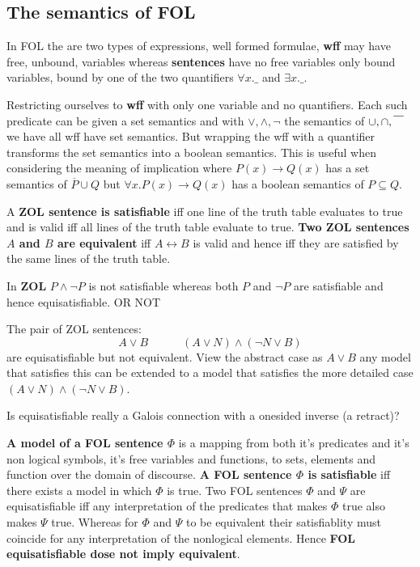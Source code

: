 \subsection{The semantics of FOL}



In FOL the are two types of expressions, well formed formulae, {\bf wff}  may have free, unbound, variables whereas  {\bf sentences} have no free variables only  bound variables, bound  by one of the two quantifiers $\forall x.\_$ and $\exists x. \_$. 


Restricting ourselves to  {\bf wff} with only one variable and no quantifiers. Each such predicate can be given a set  semantics  and with $\vee, \wedge, \neg$ the semantics of $\cup, \cap, \overline{\color{white} X}$ we have all wff have set semantics. But wrapping the wff with a quantifier transforms the set semantics into a boolean semantics. This is useful when considering the meaning of implication where  $P(x)\rightarrow Q(x)$ has a set semantics of $\overline{P} \cup Q$ but  $\forall x. P(x)\rightarrow Q(x)$ has a boolean semantics of $P \subseteq Q$.

A {\bf ZOL sentence is satisfiable}  iff one line of the truth table evaluates to true and is valid iff all lines of the truth table evaluate to true. {\bf Two ZOL sentences $A$ and $B$ are  equivalent} iff $A\leftrightarrow B$ is valid and hence iff they are satisfied by the same lines of the truth table. 

In  {\bf ZOL}  $P\wedge  \neg P$ is not satisfiable whereas both $P$ and $\neg P$ are satisfiable and hence equisatisfiable. OR NOT

The pair of ZOL sentences:
\[A\vee B \hspace{3em} (A\vee N) \wedge (\neg N \vee B)\] 
are equisatisfiable but not equivalent.  View the abstract case as $A\vee B $ any model that satisfies this can be extended to a model that satisfies the more detailed case $(A\vee N) \wedge (\neg N \vee B)$.

Is equisatisfiable really a Galois connection with a onesided inverse  (a retract)?
  


{\bf A model of a FOL sentence $\Phi$} is a mapping from both it's predicates and it's non logical symbols, it's free variables and functions, to sets, elements  and function over the domain of discourse.
{\bf A FOL sentence $\Phi$ is satisfiable} iff there exists a model in which $\Phi$ is true.   Two FOL sentences $\Phi$ and $\Psi$ are equisatisfiable iff any interpretation of the predicates that makes $\Phi$ true also makes $\Psi$ true. Whereas for $\Phi$ and $\Psi$  to be equivalent their satisfiablity must coincide for any interpretation of the nonlogical elements. Hence {\bf FOL equisatisfiable dose not imply equivalent}.

